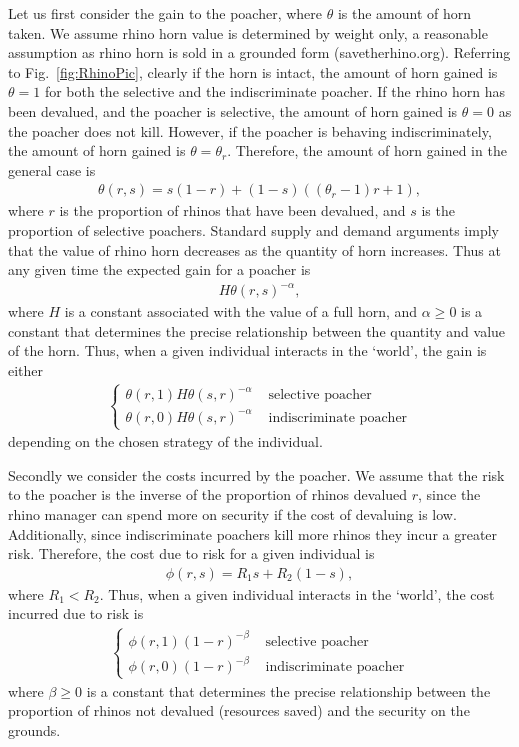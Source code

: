 \documentclass[10pt]{article}
\begin{document}
Let us first consider the gain to the poacher, where $\theta$ is the amount of horn taken. We assume rhino horn value is determined by weight only, a reasonable assumption as rhino horn is sold in a grounded form (savetherhino.org). Referring to Fig.~\ref{fig:RhinoPic}, clearly if the horn is intact, the amount of horn gained is $\theta=1$ for both the selective and the indiscriminate poacher. If the rhino horn has been devalued, and the poacher is selective, the amount of horn gained is $\theta=0$ as the poacher does not kill. However, if the poacher is behaving indiscriminately, the amount of horn gained is $\theta = \theta_r$. Therefore, the amount of horn gained in the general case is 
\begin{eqnarray}
\label{eqn:theta}
\theta(r,s) = s(1-r) + (1-s)((\theta_r -1)r + 1),
\end{eqnarray}
where $r$ is the proportion of rhinos that have been devalued, and $s$ is the proportion of selective poachers. Standard supply and demand arguments imply that the value of rhino horn decreases as the quantity of horn increases. Thus at any given time the expected gain for a poacher is 
\begin{eqnarray}
\label{eqn:world_gain}
H \theta(r,s)^{-\alpha},
\end{eqnarray}
where $H$ is a constant associated with the value of a full horn, and $ \alpha \geq 0$ is a constant that determines the precise relationship between the quantity and value of the horn. Thus, when a given individual interacts in the `world', the gain is either 
\begin{eqnarray}
\label{eqn:gain}
\left\{
\begin{array}{cl}
\theta(r,1) H \theta(s,r)^{-\alpha} & \mbox{ selective poacher}
\\
\theta(r,0) H \theta(s,r)^{-\alpha} & \mbox{ indiscriminate poacher}
\end{array} \right.
\end{eqnarray}
depending on the chosen strategy of the individual. 

Secondly we consider the costs incurred by the poacher. We assume that the risk to the poacher is the inverse of the proportion of rhinos devalued $r$, since the rhino manager can spend more on security if the cost of devaluing is low. Additionally, since indiscriminate poachers kill more rhinos they incur a greater risk. Therefore, the cost due to risk for a given individual is
\begin{eqnarray}
\label{eqn:phi}
\phi(r,s) = R_1 s + R_2 (1-s),
\end{eqnarray}
where $R_1 < R_2$. Thus, when a given individual interacts in the `world', the cost incurred due to risk is
\begin{eqnarray}
\label{eqn:loss_risk}
\left\{
\begin{array}{cl}
\phi(r,1) (1-r)^{-\beta} & \mbox{ selective poacher}
\\
\phi(r,0) (1-r)^{-\beta} & \mbox{ indiscriminate poacher}
\end{array} \right.
\end{eqnarray}
where $\beta \geq 0$ is a constant that determines the precise relationship between the proportion of rhinos not devalued (resources saved) and the security on the grounds.
\end{document}
